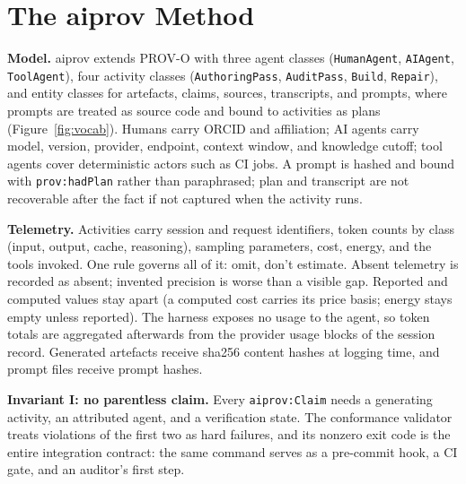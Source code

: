 \section{The aiprov Method}\label{sec:method}

\textbf{Model.} aiprov extends PROV-O with three agent classes
(\texttt{HumanAgent}, \texttt{AIAgent}, \texttt{ToolAgent}), four
activity classes (\texttt{AuthoringPass}, \texttt{AuditPass},
\texttt{Build}, \texttt{Repair}), and entity classes for artefacts,
claims, sources, transcripts, and prompts, where prompts are treated
as source code and bound to activities as plans
(Figure~\ref{fig:vocab}). Humans carry ORCID and affiliation; AI
agents carry model, version, provider, endpoint, context window, and
knowledge cutoff; tool agents cover deterministic actors such as CI
jobs. A prompt is hashed and bound with \texttt{prov:hadPlan} rather
than paraphrased; plan and transcript are not recoverable after the
fact if not captured when the activity runs.

\textbf{Telemetry.} Activities carry session and request identifiers,
token counts by class (input, output, cache, reasoning), sampling
parameters, cost, energy, and the tools invoked. One rule governs all
of it: omit, don't estimate. Absent telemetry is recorded as absent;
invented precision is worse than a visible gap. Reported and computed
values stay apart (a computed cost carries its price basis; energy
stays empty unless reported). The harness exposes no usage to the
agent, so token totals are aggregated afterwards from the provider
usage blocks of the session record. Generated artefacts
receive sha256 content hashes at logging time, and prompt files
receive prompt hashes.

\textbf{Invariant I: no parentless claim.} Every \texttt{aiprov:Claim}
needs a generating activity, an attributed agent, and a verification
state. The conformance validator treats violations of the first two as
hard failures, and its nonzero exit code is the entire integration
contract: the same command serves as a pre-commit hook, a CI gate, and
an auditor's first step.

